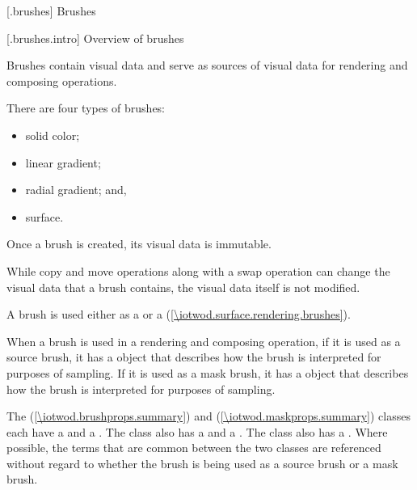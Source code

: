 
 [\iotwod.brushes] {Brushes}

 [\iotwod.brushes.intro] {Overview of brushes}

\pnum
Brushes contain visual data and serve as sources of visual data for rendering and composing operations.

\pnum
There are four types of brushes:
\begin{itemize}
	\item solid color;
	\item linear gradient;
	\item radial gradient; and,
	\item surface.
\end{itemize}

\pnum
Once a brush is created, its visual data is immutable.

\pnum
\begin{note}
While copy and move operations along with a swap operation can change the visual data that a brush contains, the visual data itself is not modified.
\end{note}

\pnum
A brush is used either as a  or a  (\ref{\iotwod.surface.rendering.brushes}).

\pnum
When a brush is used in a rendering and composing operation, if it is used as a source brush, it has a  object that describes how the brush is interpreted for purposes of sampling. If it is used as a mask brush, it has a  object that describes how the brush is interpreted for purposes of sampling.

\pnum
The  (\ref{\iotwod.brushprops.summary}) and  (\ref{\iotwod.maskprops.summary}) classes each have a  and a . The  class also has a  and a . The  class also has a . Where possible, the terms that are common between the two classes are referenced without regard to whether the brush is being used as a source brush or a mask brush.

